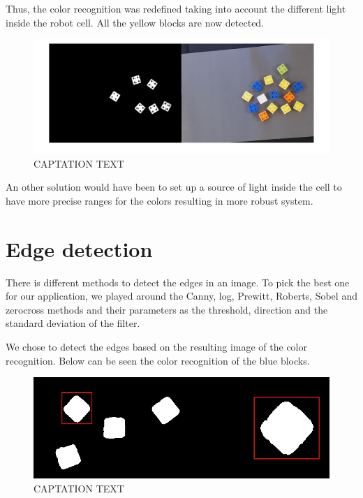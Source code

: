 \begin{flushleft}
Thus, the color recognition was redefined taking into account the different light inside the robot cell. All the yellow blocks are now detected.
\end{flushleft}


\begin{figure}[hb]
  \centering
  \includegraphics[scale=0.3]{figures/Thres_Y_good.png}
  \caption[LABEL] {CAPTATION TEXT}
\end{figure}

\begin{flushleft}
An other solution would have been to set up a source of light inside the cell to have more precise ranges for the colors resulting in more robust system.
\end{flushleft}



 \section{Edge detection}

	There is different methods to detect the edges in an image. To pick the best one for our application, we played around the Canny, log, Prewitt, Roberts, Sobel and zerocross methods and their parameters as the threshold, direction and the standard deviation of the filter. \par

 \begin{flushleft}
	We chose to detect the edges based on the resulting image of the color recognition. Below can be seen the color recognition of the blue blocks.
 \end{flushleft}

	\begin{figure}[hb]
  \centering
  \includegraphics[scale=0.3]{figures/color_rec_zoom.png}
  \caption[LABEL] {CAPTATION TEXT}
\end{figure}	
	

